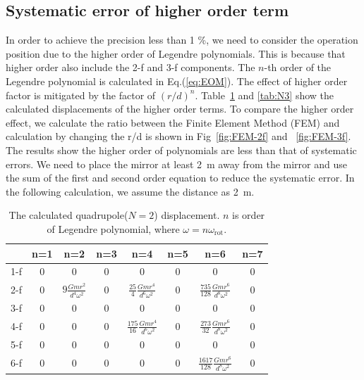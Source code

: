 \documentclass[%
 reprint,
superscriptaddress,
 amsmath,amssymb,
 aps,
]{revtex4-1}
\begin{document}
\subsection{Systematic error of higher order term}
In order to achieve the precision less than 1 \%, we need to consider the operation position due to the higher order of Legendre polynomials. This is because that higher order also include the 2-f and 3-f components. The $n$-th order of the Legendre polynomial is calculated in Eq.(\ref{eq:EOM}). The effect of higher order factor is mitigated by the factor of $(r/d)^n$. Table~\ref{tab:N2} and \ref{tab:N3} show the calculated displacements of the higher order terms. To compare the higher order effect, we calculate the ratio between the Finite Element Method (FEM) and calculation by changing the r/d is shown in Fig~\ref{fig:FEM-2f} and ~\ref{fig:FEM-3f}. The results show the higher order of polynomials are less than that of systematic errors. We need to place the mirror at least 2~m away from the mirror and use the sum of the first and second order equation to reduce the systematic error. In the following calculation, we assume the distance as 2~m. 

\begin{table}
\begin{center}
\caption{The calculated quadrupole($N=2$) displacement. $n$ is order of Legendre polynomial, where $\omega=n\omega_{\mathrm{rot}}$. \label{tab:N2}}
\footnotesize
\begin{tabular}{cccccccc}
\hline
& n=1 & n=2& n=3 &n=4&n=5&n=6&n=7 \\
\hline
1-f&0&0&0&0&0&0&0 \\
2-f&0&$9 \frac{Gmr^2}{d^4\omega^2}$&0&$\frac{25}{4} \frac{Gmr^4}{d^6\omega^2}$&0&$\frac{735}{128} \frac{Gmr^6}{d^8\omega^2}$&0  \\
3-f&0&0&0&0&0&0&0\\
4-f&0&0&0&$\frac{175}{16} \frac{Gmr^4}{d^6\omega^2}$&0& $\frac{273}{32} \frac{Gmr^6}{d^8\omega^2}$&0 \\
5-f&0&0&0&0&0&0&0 \\
6-f&0&0&0&0&0&$\frac{1617}{128} \frac{Gmr^6}{d^8\omega^2}$&0  \\
\hline
\end{tabular}
\end{center}
\end{table}
\end{document}
